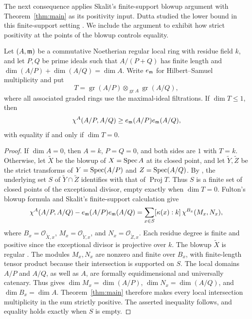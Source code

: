 The next consequence applies Skalit's finite-support blowup argument
\cite[Corollary~D]{Skalit} with Theorem~\ref{thm:main} as its positivity
input. Dutta studied the lower bound in this finite-support setting
\cite{DuttaFiniteSupport}. We include the argument to exhibit how
strict positivity at the points of the blowup controls equality.

\begin{corollary}\label{cor:tangent-cone}
Let $(A,\mathfrak{m})$ be a commutative Noetherian regular local ring with residue
field $k$, and let $P,Q$ be prime ideals such that $A/(P+Q)$ has finite
length and $\dim(A/P)+\dim(A/Q)=\dim A$. Write $e_{\mathfrak{m}}$ for Hilbert--Samuel
multiplicity and put
\[
 T=\operatorname{gr}(A/P)\otimes_{\operatorname{gr}A}\operatorname{gr}(A/Q),
\]
where all associated graded rings use the maximal-ideal filtrations.
If $\dim T\leq1$, then
\[
 \chi^A(A/P,A/Q)\geq e_{\mathfrak{m}}(A/P)e_{\mathfrak{m}}(A/Q),
\]
with equality if and only if $\dim T=0$.
\end{corollary}

\begin{proof}
If $\dim A=0$, then $A=k$, $P=Q=0$, and both sides are $1$ with $T=k$.
Otherwise, let $\widetilde X$ be the blowup of $X=\operatorname{Spec} A$ at its closed
point, and let $\widetilde Y,\widetilde Z$ be the strict transforms of
$Y=\operatorname{Spec}(A/P)$ and $Z=\operatorname{Spec}(A/Q)$. By \cite[Lemma~3.5]{SkalitUnramified},
the underlying set $S$ of $\widetilde Y\cap\widetilde Z$ identifies with
that of $\operatorname{Proj}T$. Thus $S$ is a finite set of closed points
of the exceptional divisor, empty exactly when $\dim T=0$.
Fulton's blowup formula and Skalit's finite-support calculation
\cite[Theorem~3.4 and proof of Proposition~3.10]{SkalitUnramified} give
\[
 \chi^A(A/P,A/Q)-e_{\mathfrak{m}}(A/P)e_{\mathfrak{m}}(A/Q)
   =\sum_{x\in S}[\kappa(x):k]\,\chi^{B_x}(M_x,N_x),
\]
where $B_x=\mathcal O_{\widetilde X,x}$,
$M_x=\mathcal O_{\widetilde Y,x}$, and $N_x=\mathcal O_{\widetilde Z,x}$.
Each residue degree is finite and positive since the exceptional divisor
is projective over $k$. The blowup $\widetilde X$ is regular
\cite[Proposition~A.4(1)]{Jannsen}. The modules $M_x,N_x$ are nonzero and
finite over $B_x$, with finite-length tensor product because their
intersection is supported on $S$. The local domains $A/P$ and $A/Q$,
as well as $A$, are formally equidimensional and universally catenary.
Thus \cite[Lemma~3.8 and proof of Proposition~3.10]{SkalitUnramified}
gives $\dim M_x=\dim(A/P)$, $\dim N_x=\dim(A/Q)$, and
$\dim B_x=\dim A$. Theorem~\ref{thm:main} therefore makes every local
intersection multiplicity in the sum strictly positive. The asserted
inequality follows, and equality holds exactly when $S$ is empty.
\end{proof}

